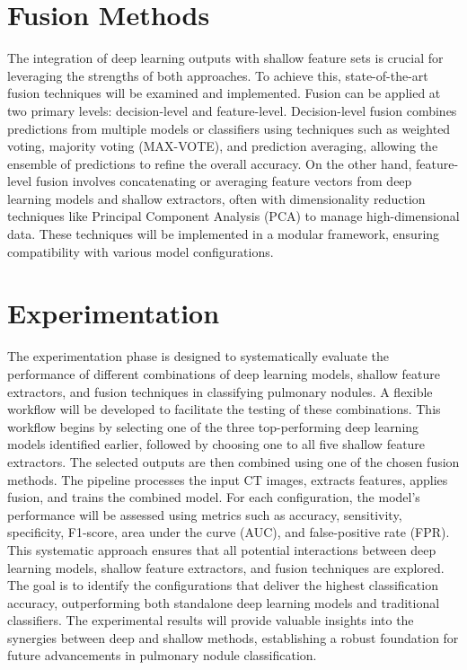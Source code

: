 \section{Fusion Methods}
The integration of deep learning outputs with shallow feature sets is crucial for leveraging the strengths of both approaches. To achieve this, state-of-the-art fusion techniques will be examined and implemented. Fusion can be applied at two primary levels: decision-level and feature-level. Decision-level fusion combines predictions from multiple models or classifiers using techniques such as weighted voting, majority voting (MAX-VOTE), and prediction averaging, allowing the ensemble of predictions to refine the overall accuracy. On the other hand, feature-level fusion involves concatenating or averaging feature vectors from deep learning models and shallow extractors, often with dimensionality reduction techniques like Principal Component Analysis (PCA) to manage high-dimensional data. These techniques will be implemented in a modular framework, ensuring compatibility with various model configurations.

\section{Experimentation}
The experimentation phase is designed to systematically evaluate the performance of different combinations of deep learning models, shallow feature extractors, and fusion techniques in classifying pulmonary nodules. A flexible workflow will be developed to facilitate the testing of these combinations. This workflow begins by selecting one of the three top-performing deep learning models identified earlier, followed by choosing one to all five shallow feature extractors. The selected outputs are then combined using one of the chosen fusion methods. The pipeline processes the input CT images, extracts features, applies fusion, and trains the combined model. For each configuration, the model's performance will be assessed using metrics such as accuracy, sensitivity, specificity, F1-score, area under the curve (AUC), and false-positive rate (FPR).
This systematic approach ensures that all potential interactions between deep learning models, shallow feature extractors, and fusion techniques are explored. The goal is to identify the configurations that deliver the highest classification accuracy, outperforming both standalone deep learning models and traditional classifiers. The experimental results will provide valuable insights into the synergies between deep and shallow methods, establishing a robust foundation for future advancements in pulmonary nodule classification.

